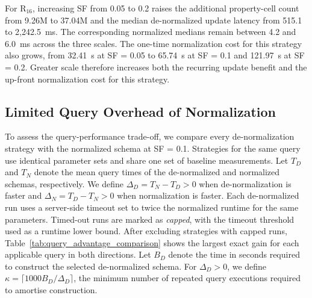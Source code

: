 \documentclass[sigconf]{acmart}
\begin{document}
For $\mathrm{R}_{16}$, increasing SF from 0.05 to 0.2 raises the additional
property-cell count from 9.26M to 37.04M and the median de-normalized update
latency from 515.1 to 2,242.5~ms. The corresponding normalized medians remain
between 4.2 and 6.0~ms across the three scales. The one-time normalization cost
for this strategy also grows, from 32.41~s at SF = 0.05 to 65.74~s at SF = 0.1
and 121.97~s at SF = 0.2. Greater scale therefore increases both the recurring
update benefit and the up-front normalization cost for this strategy.

\subsection{Limited Query Overhead of Normalization}

To assess the query-performance trade-off, we compare every de-normalization
strategy with the normalized schema at SF = 0.1. Strategies for the same query
use identical parameter sets and share one set of baseline measurements. Let
$T_D$ and $T_N$ denote the mean query times of the de-normalized and normalized
schemas, respectively. We define $\Delta_D=T_N-T_D>0$ when de-normalization is
faster and $\Delta_N=T_D-T_N>0$ when normalization is faster.
Each de-normalized run uses a server-side timeout set to twice the normalized
runtime for the same parameters. Timed-out runs are marked as \emph{capped},
with the timeout threshold used as a runtime lower bound.
After excluding strategies with capped runs,
Table~\ref{tab:query_advantage_comparison} shows the largest
exact gain for each applicable query in both directions. Let $B_D$ denote the
time in seconds required to construct the selected de-normalized schema. For
$\Delta_D>0$, we define
$\kappa=\lceil 1000B_D/\Delta_D\rceil$, the minimum number of
repeated query executions required to amortise construction.
\end{document}
